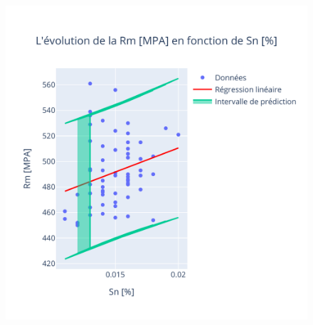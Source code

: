 \documentclass[12pt]{article}
\begin{document}
\begin{figure}[H]
{\begin{minipage}{0.8\textwidth}
            \includegraphics[width=\textwidth]{Images/Statistique/Regression_Sn_Rm.pdf}
        \end{minipage}
    }\\[0.5cm]  %
\end{figure}
\end{document}
